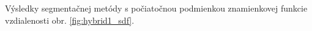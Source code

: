 \documentclass[a4paper,11pt,oneside]{article}%
\begin{document}
Výsledky segmentačnej metódy s počiatočnou podmienkou znamienkovej funkcie vzdialenosti obr. \ref{fig:hybrid1_sdf}.

\begin{figure}[H]  
    \hspace{5px}

\end{figure}
\end{document}
